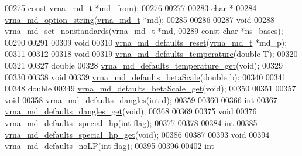 \begin{DoxyCode}
00275              \textcolor{keyword}{const} \hyperlink{group__model__details_structvrna__md__s}{vrna\_md\_t}  *md\_from);
00276 
00277 
00283 \textcolor{keywordtype}{char} *
00284 \hyperlink{group__model__details_ga3a7469f0725a849af6ba61a57dfd60ce}{vrna\_md\_option\_string}(\hyperlink{group__model__details_structvrna__md__s}{vrna\_md\_t} *md);
00285 
00286 
00287 \textcolor{keywordtype}{void}
00288 vrna\_md\_set\_nonstandards(\hyperlink{group__model__details_structvrna__md__s}{vrna\_md\_t}  *md,
00289                          \textcolor{keyword}{const} \textcolor{keywordtype}{char} *ns\_bases);
00290 
00291 
00309 \textcolor{keywordtype}{void}
00310 \hyperlink{group__model__details_ga70834424cf804d149937de89f80ceb45}{vrna\_md\_defaults\_reset}(\hyperlink{group__model__details_structvrna__md__s}{vrna\_md\_t} *md\_p);
00311 
00312 
00318 \textcolor{keywordtype}{void}
00319 \hyperlink{group__model__details_gaf9e527e9a2f7e6fd6e42bc6e602f5445}{vrna\_md\_defaults\_temperature}(\textcolor{keywordtype}{double} T);
00320 
00321 
00327 \textcolor{keywordtype}{double}
00328 \hyperlink{group__model__details_ga96b24a74437f9ba46c4e06343155bf46}{vrna\_md\_defaults\_temperature\_get}(\textcolor{keywordtype}{void});
00329 
00330 
00338 \textcolor{keywordtype}{void}
00339 \hyperlink{group__model__details_gae984567db36c3f9b8731ecc917abf3a2}{vrna\_md\_defaults\_betaScale}(\textcolor{keywordtype}{double} b);
00340 
00341 
00348 \textcolor{keywordtype}{double}
00349 \hyperlink{group__model__details_gabb8780f5410c52f970d75b044059bd09}{vrna\_md\_defaults\_betaScale\_get}(\textcolor{keywordtype}{void});
00350 
00351 
00357 \textcolor{keywordtype}{void}
00358 \hyperlink{group__model__details_gac76a5374def8e5e4e644ff6e4cc72dee}{vrna\_md\_defaults\_dangles}(\textcolor{keywordtype}{int} d);
00359 
00360 
00366 \textcolor{keywordtype}{int}
00367 \hyperlink{group__model__details_ga67ca06f95ae133778c79a4493c9817b8}{vrna\_md\_defaults\_dangles\_get}(\textcolor{keywordtype}{void});
00368 
00369 
00375 \textcolor{keywordtype}{void}
00376 \hyperlink{group__model__details_gafff6449a02744add0308e653230c15fc}{vrna\_md\_defaults\_special\_hp}(\textcolor{keywordtype}{int} flag);
00377 
00378 
00384 \textcolor{keywordtype}{int}
00385 \hyperlink{group__model__details_ga1d68a6efdaa1253cc63fd9cd06452559}{vrna\_md\_defaults\_special\_hp\_get}(\textcolor{keywordtype}{void});
00386 
00387 
00393 \textcolor{keywordtype}{void}
00394 \hyperlink{group__model__details_ga2f88ffc393ac9d7987849c965fd29ea8}{vrna\_md\_defaults\_noLP}(\textcolor{keywordtype}{int} flag);
00395 
00396 
00402 \textcolor{keywordtype}{int}

\end{DoxyCode}
